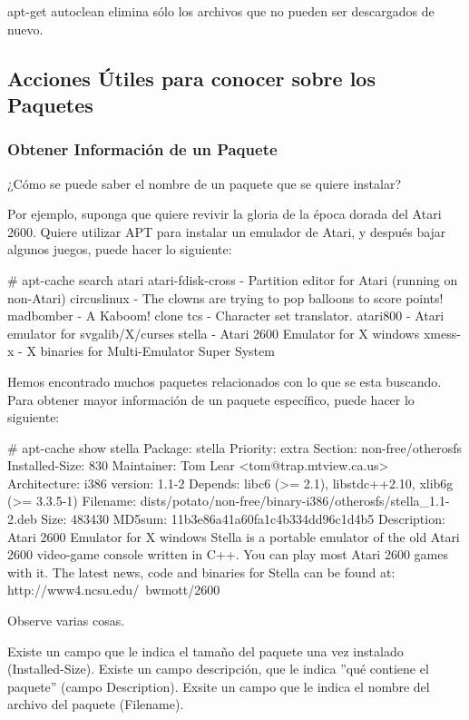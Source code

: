 \documentclass[12pt]{article}
\begin{document}
apt-get autoclean elimina sólo los archivos que no pueden ser descargados de nuevo.

\subsection*{Acciones Útiles para conocer sobre los Paquetes}
\subsubsection*{Obtener Información de un Paquete}

 ¿Cómo se puede saber el nombre de un paquete que se quiere instalar?

Por ejemplo, suponga que quiere revivir la gloria de la época dorada del Atari 2600. Quiere utilizar APT para instalar un emulador de Atari, y después bajar algunos juegos, puede hacer lo siguiente:

     # apt-cache search atari
     atari-fdisk-cross - Partition editor for Atari (running on non-Atari)
     circuslinux - The clowns are trying to pop balloons to score points!
     madbomber - A Kaboom! clone
     tcs - Character set translator.
     atari800 - Atari emulator for svgalib/X/curses
     stella - Atari 2600 Emulator for X windows
     xmess-x - X binaries for Multi-Emulator Super System

Hemos encontrado muchos paquetes relacionados con lo que se esta buscando. Para obtener mayor información de un paquete específico, puede hacer lo siguiente:

     # apt-cache show stella
     Package: stella
     Priority: extra
     Section: non-free/otherosfs
     Installed-Size: 830
     Maintainer: Tom Lear <tom@trap.mtview.ca.us>
     Architecture: i386
     version: 1.1-2
     Depends: libc6 (>= 2.1), libstdc++2.10, xlib6g (>= 3.3.5-1)
     Filename: dists/potato/non-free/binary-i386/otherosfs/stella_1.1-2.deb
     Size: 483430
     MD5sum: 11b3e86a41a60fa1c4b334dd96c1d4b5
     Description: Atari 2600 Emulator for X windows
      Stella is a portable emulator of the old Atari 2600 video-game console
      written in C++. You can play most Atari 2600 games with it. The latest
      news, code and binaries for Stella can be found at:
      http://www4.ncsu.edu/~bwmott/2600

Observe varias cosas.

Existe un campo que le indica el tamaño del paquete una vez instalado (Installed-Size).
Existe un campo descripción, que le indica ''qué contiene el paquete'' (campo Description).
Exsite un campo que le indica el nombre del archivo del paquete (Filename).
\end{document}

